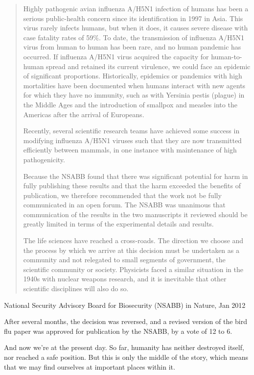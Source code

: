 \documentclass{article}
\begin{document}
\blockquote{Highly pathogenic avian influenza A/H5N1 infection of humans has been a serious
public-health concern since its identification in 1997 in Asia. This virus
rarely infects humans, but when it does, it causes severe disease with case
fatality rates of 59\%. To date, the transmission of influenza A/H5N1 virus from
human to human has been rare, and no human pandemic has occurred. If influenza
A/H5N1 virus acquired the capacity for human-to-human spread and retained its
current virulence, we could face an epidemic of significant proportions.
Historically, epidemics or pandemics with high mortalities have been documented
when humans interact with new agents for which they have no immunity, such as
with Yersinia pestis (plague) in the Middle Ages and the introduction of
smallpox and measles into the Americas after the arrival of Europeans.

Recently, several scientific research teams have achieved some success in
modifying influenza A/H5N1 viruses such that they are now transmitted
efficiently between mammals, in one instance with maintenance of high
pathogenicity.

Because the NSABB found that there was significant potential for harm in fully
publishing these results and that the harm exceeded the benefits of
publication, we therefore recommended that the work not be fully communicated
in an open forum. The NSABB was unanimous that communication of the results in
the two manuscripts it reviewed should be greatly limited in terms of the
experimental details and results.

The life sciences have reached a cross-roads. The direction we choose and the
process by which we arrive at this decision must be undertaken as a community
and not relegated to small segments of government, the scientific community or
society. Physicists faced a similar situation in the 1940s with nuclear weapons
research, and it is inevitable that other scientific disciplines will also do
so.}{National Security Advisory Board for Biosecurity (NSABB) in Nature, Jan 2012}

After several months, the decision was reversed, and a revised version of the
bird flu paper was approved for publication by the NSABB, by a vote of 12 to 6.



And now we're at the present day. So far, humanity has neither destroyed
itself, nor reached a safe position. But this is only the middle of the story,
which means that we may find ourselves at important places within it.
\end{document}
